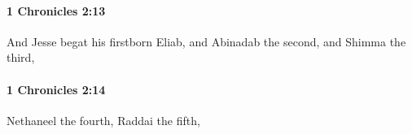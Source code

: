 		\paragraph{1 Chronicles 2:13} %
			\label{1CHRONICLES-2-13}

			And Jesse begat his firstborn Eliab, and Abinadab the second, and Shimma the third,


		\paragraph{1 Chronicles 2:14} %
			\label{1CHRONICLES-2-14}

			Nethaneel the fourth, Raddai the fifth,


